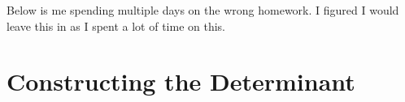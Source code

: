 \documentclass[a4paper]{article}
\begin{document}
\pagebreak
Below is me spending multiple days on the wrong homework. I figured I would leave this in as I spent a lot of time on this.

\part*{Constructing the Determinant}


\pagebreak



\pagebreak


\end{document}
